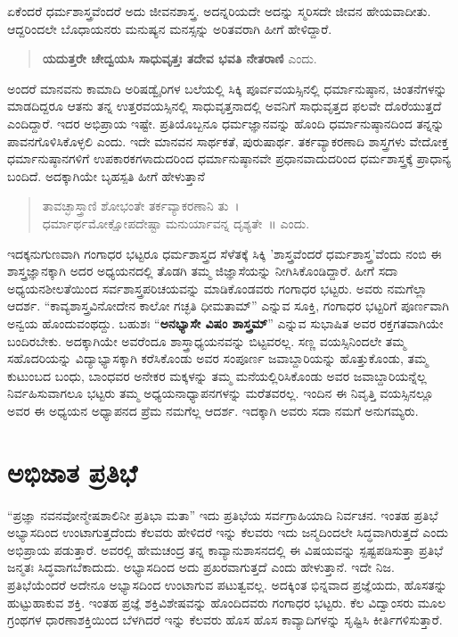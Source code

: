 {ಏಕೆಂದರೆ ಧರ್ಮಶಾಸ್ತ್ರವೆಂದರೆ ಅದು ಜೀವನಶಾಸ್ತ್ರ. ಅದನ್ನರಿಯದೇ ಅದನ್ನು ಸ್ಮರಿಸದೇ ಜೀವನ ಹೇಯವಾದೀತು. ಆದ್ದರಿಂದಲೇ ಬೊಧಾಯನರು ಮನುಷ್ಯನ ಮನಸ್ಸನ್ನು ಅರಿತವರಾಗಿ ಹೀಗೆ ಹೇಳಿದ್ದಾರೆ.
\begin{verse}
\textbf{ಯದುತ್ತರೇ ಚೇದ್ವಯಸಿ ಸಾಧುವೃತ್ತಃ ತದೇವ ಭವತಿ ನೇತರಾಣಿ} ಎಂದು.
\end{verse}
ಅಂದರೆ ಮಾನವನು ಕಾಮಾದಿ ಅರಿಷಡ್ವೈರಿಗಳ ಬಲೆಯಲ್ಲಿ ಸಿಕ್ಕಿ ಪೂರ್ವವಯಸ್ಸಿನಲ್ಲಿ ಧರ್ಮಾನುಷ್ಠಾನ, ಚಿಂತನೆಗಳನ್ನು ಮಾಡದಿದ್ದರೂ ಆತನು ತನ್ನ ಉತ್ತರವಯಸ್ಸಿನಲ್ಲಿ ಸಾಧುವೃತ್ತನಾದಲ್ಲಿ ಅವನಿಗೆ ಸಾಧುವೃತ್ತದ ಫಲವೇ ದೊರೆಯುತ್ತದೆ ಎಂದಿದ್ದಾರೆ. ಇದರ ಅಭಿಪ್ರಾಯ ಇಷ್ಟೇ. ಪ್ರತಿಯೊಬ್ಬನೂ ಧರ್ಮಜ್ಞಾನವನ್ನು ಹೊಂದಿ ಧರ್ಮಾನುಷ್ಠಾನದಿಂದ ತನ್ನನ್ನು ಪಾವನಗೊಳಿಸಿಕೊಳ್ಳಲಿ ಎಂದು. ಇದೇ ಮಾನವನ ಸಾರ್ಥಕತೆ, ಪುರುಷಾರ್ಥ. ತರ್ಕವ್ಯಾಕರಣಾದಿ ಶಾಸ್ತ್ರಗಳು ವೇದೋಕ್ತ ಧರ್ಮಾನುಷ್ಠಾನಗಳಿಗೆ ಉಪಕಾರಕಗಳಾದುದರಿಂದ ಧರ್ಮಾನುಷ್ಠಾನವೇ ಪ್ರಧಾನವಾದುದರಿಂದ ಧರ್ಮಶಾಸ್ತ್ರಕ್ಕೆ ಪ್ರಾಧಾನ್ಯ ಬಂದಿದೆ. ಅದಕ್ಕಾಗಿಯೇ ಬೃಹಸ್ಪತಿ ಹೀಗೆ ಹೇಳುತ್ತಾನೆ  \enginline{-}  
\begin{verse}
ತಾವಚ್ಛಾಸ್ತ್ರಾಣಿ ಶೋಭಂತೇ ತರ್ಕವ್ಯಾಕರಣಾನಿ ತು~।\\
ಧರ್ಮಾರ್ಥಮೋಕ್ಷೋಪದೇಷ್ಟಾ ಮನುರ್ಯಾವನ್ನ ದೃಶ್ಯತೇ~॥ ಎಂದು.
\end{verse}
ಇದಕ್ಕನುಗುಣವಾಗಿ ಗಂಗಾಧರ ಭಟ್ಟರೂ ಧರ್ಮಶಾಸ್ತ್ರದ ಸೆಳೆತಕ್ಕೆ ಸಿಕ್ಕಿ ’ಶಾಸ್ತ್ರವೆಂದರೆ ಧರ್ಮಶಾಸ್ತ್ರ’ವೆಂದು ನಂಬಿ ಈ ಶಾಸ್ತ್ರಜ್ಞಾನಕ್ಕಾಗಿ ಅದರ ಅಧ್ಯಯನದಲ್ಲಿ ತೊಡಗಿ ತಮ್ಮ ಜಿಜ್ಞಾಸೆಯನ್ನು ನೀಗಿಸಿಕೊಂಡಿದ್ದಾರೆ. ಹೀಗೆ ಸದಾ ಅಧ್ಯಯನಶೀಲತೆಯಿಂದ ಸರ್ವಶಾಸ್ತ್ರಪರಿಚಯವನ್ನು ಮಾಡಿಕೊಂಡವರು ಗಂಗಾಧರ ಭಟ್ಟರು. ಅವರು ನಮಗೆಲ್ಲಾ ಆದರ್ಶ. “ಕಾವ್ಯಶಾಸ್ತ್ರವಿನೋದೇನ ಕಾಲೋ ಗಚ್ಛತಿ ಧೀಮತಾಮ್” ಎನ್ನುವ ಸೂಕ್ತಿ, ಗಂಗಾಧರ ಭಟ್ಟರಿಗೆ ಪೂರ್ಣವಾಗಿ ಅನ್ವಯ ಹೊಂದುವಂಥದ್ದು. ಬಹುಶಃ “\textbf{ಅನಭ್ಯಾಸೇ ವಿಷಂ ಶಾಸ್ತ್ರಮ್}” ಎನ್ನುವ ಸುಭಾಷಿತ ಅವರ ರಕ್ತಗತವಾಗಿಯೇ ಬಂದಿರಬೇಕು. ಅದಕ್ಕಾಗಿಯೇ ಅವರೆಂದೂ ಶಾಸ್ತ್ರಾಧ್ಯಯನವನ್ನು ಬಿಟ್ಟವರಲ್ಲ. ಸಣ್ಣ ವಯಸ್ಸಿನಿಂದಲೇ ತಮ್ಮ ಸಹೊದರಿಯನ್ನು ವಿದ್ಯಾಭ್ಯಾಸಕ್ಕಾಗಿ ಕರೆಸಿಕೊಂಡು ಅವರ ಸಂಪೂರ್ಣ ಜವಾಬ್ದಾರಿಯನ್ನು ಹೊತ್ತುಕೊಂಡು, ತಮ್ಮ ಕುಟುಂಬದ ಬಂಧು, ಬಾಂಧವರ ಅನೇಕರ ಮಕ್ಕಳನ್ನು ತಮ್ಮ ಮನೆಯಲ್ಲಿರಿಸಿಕೊಂಡು ಅವರ ಜವಾಬ್ದಾರಿಯನ್ನೆಲ್ಲ ನಿರ್ವಹಿಸುವಾಗಲೂ ಭಟ್ಟರು ತಮ್ಮ ಅಧ್ಯಯನಾಧ್ಯಾಪನಗಳನ್ನು ಮರೆತವರಲ್ಲ. ಇಂದಿನ ಈ ನಿವೃತ್ತಿ ವಯಸ್ಸಿನಲ್ಲೂ ಅವರ ಈ ಅಧ್ಯಯನ ಅಧ್ಯಾಪನದ ಪ್ರೆಮ ನಮಗೆಲ್ಲ ಆದರ್ಶ. ಇದಕ್ಕಾಗಿ ಅವರು ಸದಾ ನಮಗೆ ಅನುಗಮ್ಯರು.

\section*{ಅಭಿಜಾತ ಪ್ರತಿಭೆ}  

“ಪ್ರಜ್ಞಾ ನವನವೋನ್ಮೇಷಶಾಲಿನೀ ಪ್ರತಿಭಾ ಮತಾ” ಇದು ಪ್ರತಿಭೆಯ ಸರ್ವಗ್ರಾಹಿಯಾದಿ ನಿರ್ವಚನ. ಇಂತಹ ಪ್ರತಿಭೆ ಅಭ್ಯಾಸದಿಂದ ಉಂಟಾಗುತ್ತದೆಂದು ಕೆಲವರು ಹೇಳಿದರೆ ಇನ್ನು ಕೆಲವರು ಇದು ಜನ್ಮದಿಂದಲೇ ಸಿದ್ಧವಾಗಿರುತ್ತದೆ ಎಂದು ಅಭಿಪ್ರಾಯ ಪಡುತ್ತಾರೆ. ಅವರಲ್ಲಿ ಹೇಮಚಂದ್ರ ತನ್ನ ಕಾವ್ಯಾನುಶಾಸನದಲ್ಲಿ ಈ ವಿಷಯವನ್ನು ಸ್ಪಷ್ಟಪಡಿಸುತ್ತಾ ಪ್ರತಿಭೆ ಜನ್ಮತಃ ಸಿದ್ಧವಾಗಬೆಕಾದುದು. ಅಭ್ಯಾಸದಿಂದ ಅದು ಪ್ರಖರವಾಗುತ್ತದೆ ಎಂದು ಹೇಳುತ್ತಾನೆ. ಇದೇ ನಿಜ. ಪ್ರತಿಭೆಯೆಂದರೆ ಅದೇನೂ ಅಭ್ಯಾಸದಿಂದ ಉಂಟಾಗುವ ಪಟುತ್ವವಲ್ಲ. ಅದಕ್ಕಿಂತ ಭಿನ್ನವಾದ ಪ್ರಜ್ಞೆಯದು, ಹೊಸತನ್ನು ಹುಟ್ಟುಹಾಕುವ ಶಕ್ತಿ. ಇಂತಹ ಪ್ರಜ್ಞೆ ಶಕ್ತಿವಿಶೇಷವನ್ನು ಹೊಂದಿದವರು ಗಂಗಾಧರ ಭಟ್ಟರು. ಕೆಲ ವಿದ್ವಾಂಸರು ಮೂಲ ಗ್ರಂಥಗಳ ಧಾರಣಾಶಕ್ತಿಯಿಂದ ಬೆಳಗಿದರೆ ಇನ್ನು ಕೆಲವರು ಹೊಸ ಹೊಸ ಕಾವ್ಯಾದಿಗಳನ್ನು ಸೃಷ್ಟಿಸಿ ಕೀರ್ತಿಗಳಿಸುತ್ತಾರೆ. 

}
